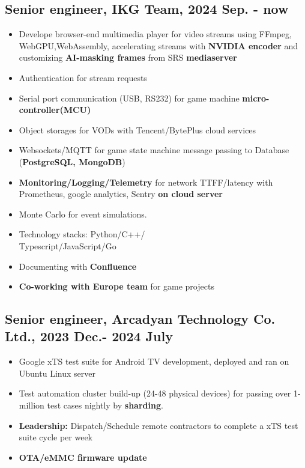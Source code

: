 \documentclass[11pt]{article}
\begin{document}
\begin{multicols*}{2}
\subsection*{Senior engineer, IKG Team, 2024 Sep. - now}
\begin{itemize}[noitemsep]
    \item Develope browser-end multimedia player for video streams using FFmpeg, WebGPU,WebAssembly, accelerating streams with \textbf{NVIDIA encoder} and customizing\textbf{ AI-masking frames} from SRS\textbf{ mediaserver} 
    \item Authentication for stream requests
    \item Serial port communication (USB, RS232) for game machine \textbf{micro-controller(MCU)}
    \item Object storages for VODs with Tencent/BytePlus cloud services
    \item Websockets/MQTT for game state machine message passing to Database (\textbf{PostgreSQL, MongoDB})
    \item \textbf{Monitoring/Logging/Telemetry} for network TTFF/latency with Prometheus, google analytics, Sentry \textbf{on cloud server}
    \item Monte Carlo for event simulations.
    \item Technology stacks: Python/C++/\\Typescript/JavaScript/Go 
    \item Documenting with \textbf{Confluence}
    \item \textbf{Co-working with Europe team} for game projects
\end{itemize}

\subsection*{Senior engineer, Arcadyan Technology Co. Ltd., 2023 Dec.- 2024 July }
\begin{itemize}[noitemsep]
    \item Google xTS test suite for Android TV development, deployed and ran on Ubuntu Linux server
    \item Test automation cluster build-up (24-48 physical devices) for passing over 1-million test cases nightly by \textbf{sharding}.
    \item \textbf{Leadership:} Dispatch/Schedule remote contractors to complete a xTS test suite cycle per week
    \item \textbf{OTA/eMMC firmware update}
\end{itemize}


\end{multicols*}
\end{document}
